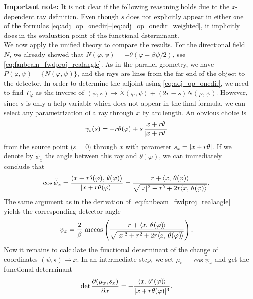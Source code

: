 \documentclass{amsart}
\renewcommand*{\phi}{\varphi}
\begin{document}
\begin{example}
 \textbf{Important note:} It is not clear if the following reasoning holds due to the $x$-dependent ray definition. Even though $s$ does 
 not explicitly appear in either one of the formulas \eqref{eq:adj_op_onedir}--\eqref{eq:adj_op_onedir_weighted}, it implicitly does in the 
 evaluation point of the functional determinant.\\[1ex]
 We now apply the unified theory to compare the results. For the directional field $N$, we already showed that 
 $N(\phi,\psi) = -\theta(\phi + \beta\psi/2)$, see \eqref{eq:fanbeam_fwdproj_realangle}. As in the parallel geometry, we have 
 $P(\phi,\psi) = \lbrace N(\phi,\psi)\rbrace$, and the rays are lines from the far end of the object to the detector. In order to determine 
 the adjoint using \eqref{eq:adj_op_onedir}, we need to find $\Gamma_\phi$ as the inverse of 
 $(\psi, s) \mapsto \tilde X(\phi, \psi) + (2r - s) N(\phi,\psi)$. However, since $s$ is only a help variable which does not appear in the 
 final formula, we can select any parametrization of a ray through $x$ by arc length. An obvious choice is
 \begin{equation*}
  \gamma_x(s) = -r \theta(\phi) + s\, \frac{x + r\theta}{\ABS{x + r\theta}}
 \end{equation*}
 from the source point ($s=0$) through $x$ with parameter $s_x=|x + r\theta|$. If we denote by $\tilde\psi_x$ the angle between this 
ray and  $\theta(\phi)$, we can immediately conclude that
 \begin{equation*}
  \cos \tilde\psi_x = \frac{\INNER{x + r\theta(\phi)}{\theta(\phi)}}{\ABS{x + r\theta(\phi)}} 
  = \frac{r + \INNER{x}{\theta(\phi)}}{\sqrt{\ABS{x}^2 + r^2 + 2r \INNER{x}{\theta(\phi)}}}.
 \end{equation*}
 The same argument as in the derivation of \eqref{eq:fanbeam_fwdproj_realangle} yields the corresponding detector angle
 \begin{equation}
  \label{eq:fanbeam_psi_x}
  \psi_x = \frac{2}{\beta}\, \arccos\left( \frac{r + \INNER{x}{\theta(\phi)}}{\sqrt{\ABS{x}^2 + r^2 + 2r \INNER{x}{\theta(\phi)}}} \right).
 \end{equation}
 Now it remains to calculate the functional determinant of the change of coordinates $(\psi, s) \to x$. In an intermediate step, we set 
 $\mu_x = \cos \tilde\psi_x$ and get the functional determinant
 \begin{equation*}
  \DET \frac{\partial(\mu_x, s_x)}{\partial x} = - \frac{\INNER{x}{\theta'(\phi)}}{\ABS{x + r \theta(\phi)}^3}.
 \end{equation*}

\end{example}
\end{document}
